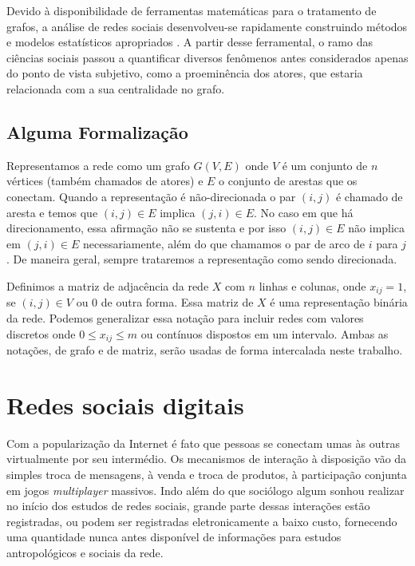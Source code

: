 \documentclass{article}
\begin{document}
Devido à disponibilidade de ferramentas matemáticas para o tratamento de grafos,
a análise de redes sociais desenvolveu-se rapidamente construindo métodos e
modelos estatísticos apropriados \cite{Butts2009}. A partir desse ferramental, o
ramo das ciências sociais passou a quantificar diversos fenômenos antes
considerados apenas do ponto de vista subjetivo, como a proeminência dos atores,
que estaria relacionada com a sua centralidade no grafo.

\subsection{Alguma Formalização}

Representamos a rede como um grafo $G(V,E)$ onde $V$ é um conjunto de $n$
vértices (também chamados de atores) e $E$ o conjunto de arestas que os conectam.
Quando a representação é não-direcionada o par $(i,j)$ é chamado de aresta e
temos que $(i,j) \in E$ implica $(j,i) \in E$. No caso em que há direcionamento,
essa afirmação não se sustenta e por isso $(i,j) \in E$ não implica em $(j,i) \in
E$ necessariamente, além do que chamamos o par de arco de $i$ para $j$. De
maneira geral, sempre trataremos a representação como sendo direcionada.

Definimos a matriz de adjacência da rede $X$ com $n$ linhas e colunas, onde
$x_{ij} = 1$, se $(i,j) \in V$ ou 0 de outra forma. Essa matriz de $X$ é uma
representação binária da rede. Podemos generalizar essa notação para incluir
redes com valores discretos onde $0 \leq x_{ij} \leq m$ ou contínuos dispostos em
um intervalo. Ambas as notações, de grafo e de matriz, serão usadas de forma
intercalada neste trabalho.

\section{Redes sociais digitais}

Com a popularização da Internet é fato que pessoas se conectam umas às outras
virtualmente por seu intermédio. Os mecanismos de interação à disposição vão da
simples troca de mensagens, à venda e troca de produtos, à participação conjunta
em jogos \textit{multiplayer} massivos. Indo além do que sociólogo algum sonhou
realizar no início dos estudos de redes sociais, grande parte dessas interações
estão registradas, ou podem ser registradas eletronicamente a baixo custo,
fornecendo uma quantidade nunca antes disponível de informações para
estudos antropológicos e sociais da rede.
\end{document}
